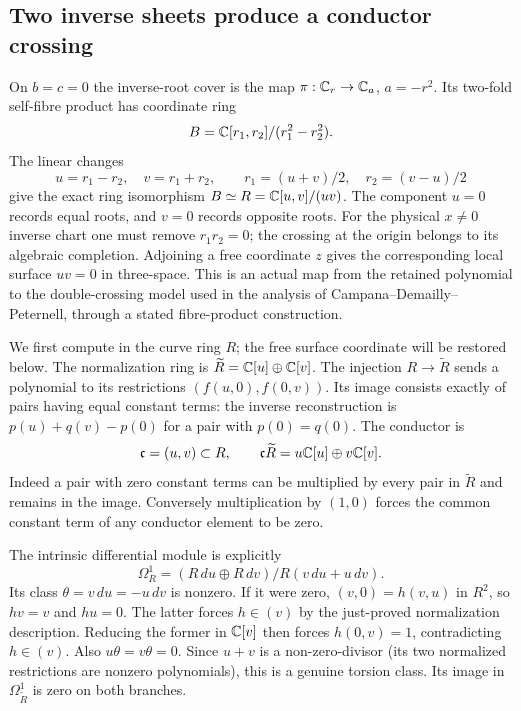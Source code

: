 \subsection{Two inverse sheets produce a conductor crossing}
\label{sec:retained-conductor}
On $b=c=0$ the inverse-root cover is the map
$\pi:\mathbb C_r\to\mathbb C_a$, $a=-r^2$. Its two-fold self-fibre product has
coordinate ring
\[
 B=\mathbb C[r_1,r_2]/(r_1^2-r_2^2).
\]
The linear changes
\begin{equation}
 u=r_1-r_2,\quad v=r_1+r_2,
 \qquad r_1=(u+v)/2,\quad r_2=(v-u)/2
 \label{eq:retained-node-map}
\end{equation}
give the exact ring isomorphism $B\simeq R=\mathbb C[u,v]/(uv)$.
The component $u=0$ records equal roots, and $v=0$ records opposite
roots. For the physical $x\ne0$ inverse chart one must remove $r_1r_2=0$;
the crossing at the origin belongs to its algebraic completion.
Adjoining a free coordinate $z$ gives the corresponding local surface
$uv=0$ in three-space. This is an actual map from the retained
polynomial to the double-crossing model used in the analysis of
Campana--Demailly--Peternell\cite[Section~7, p.~692]{cdp2020},
through a stated fibre-product construction.

We first compute in the curve ring $R$; the free surface coordinate
will be restored below. The normalization ring is
$\widetilde R=\mathbb C[u]\oplus\mathbb C[v]$.
The injection $R\to\widetilde R$ sends a polynomial to its
restrictions $(f(u,0),f(0,v))$. Its image consists exactly of pairs
having equal constant terms: the inverse reconstruction is
$p(u)+q(v)-p(0)$ for a pair with $p(0)=q(0)$.
The conductor is
\[
 \mathfrak c=(u,v)\subset R,
 \qquad \mathfrak c\widetilde R=u\mathbb C[u]\oplus v\mathbb C[v].
\]
Indeed a pair with zero constant terms can be multiplied by every
pair in $\widetilde R$ and remains in the image. Conversely
multiplication by $(1,0)$ forces the common constant term of any
conductor element to be zero.

The intrinsic differential module is explicitly
\begin{equation}
 \Omega_R^1=(R\,du\oplus R\,dv)/R(v\,du+u\,dv).
 \label{eq:retained-node-differentials}
\end{equation}
Its class $\theta=v\,du=-u\,dv$ is nonzero. If it were zero,
$(v,0)=h(v,u)$ in $R^2$, so $hv=v$ and $hu=0$.
The latter forces $h\in(v)$ by the just-proved normalization
description. Reducing the former in $\mathbb C[v]$ then forces $h(0,v)=1$,
contradicting $h\in(v)$. Also $u\theta=v\theta=0$.
Since $u+v$ is a non-zero-divisor (its two normalized restrictions
are nonzero polynomials), this is a genuine torsion class.
Its image in $\Omega_{\widetilde R}^1$ is zero on both branches.

